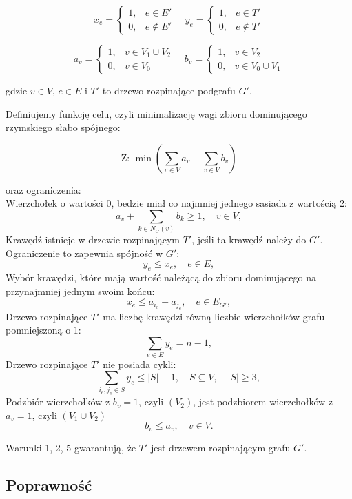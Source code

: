 \[
x_e =
\begin{cases}
1, & e \in E' \\
0, & e \notin E'
\end{cases}
\quad
y_e =
\begin{cases}
1, & e \in T' \\
0, & e \notin T'
\end{cases}
\]

\[
a_v =
\begin{cases}
1, & v \in V_1 \cup V_2 \\
0, & v \in V_0
\end{cases}
\quad
b_v =
\begin{cases}
1, & v \in V_2 \\
0, & v \in V_0 \cup V_1
\end{cases}
\]

gdzie \( v \in V \), \( e \in E \) i \( T' \) to drzewo rozpinające podgrafu \( G' \).

Definiujemy funkcję celu, czyli minimalizację wagi zbioru dominującego rzymskiego słabo spójnego:

\[
\text{Z: } \min \left( \sum_{v \in V} a_v + \sum_{v \in V} b_v \right)
\]

oraz ograniczenia:\\
Wierzchołek o wartości 0, bedzie miał co najmniej jednego sasiada z wartością 2:
\[
    a_v + \sum_{k \in N_G(v)} b_k \geq 1, \quad v \in V, \tag{1}
\]
Krawędź istnieje w drzewie rozpinającym \( T' \), jeśli ta krawędź należy do \( G' \). Ograniczenie to zapewnia spójność w \( G' \):
\[
    y_e \leq x_e, \quad e \in E, \tag{2}
\]
Wybór krawędzi, które mają  wartość należącą do zbioru dominującego na przynajmniej jednym swoim końcu:
\[
    x_e \leq a_{i_e} + a_{j_e}, \quad e \in E_{G'}, \tag{3}
\]
Drzewo rozpinające \( T' \) ma liczbę krawędzi równą liczbie wierzchołków grafu pomniejszoną o 1:
\[
    \sum_{e \in E} y_e = n - 1, \tag{4}
\]
Drzewo rozpinające \( T' \) nie posiada cykli:
\[
    \sum_{i_e, j_e \in S} y_e \leq |S| - 1, \quad S \subseteq V, \quad |S| \geq 3, \tag{5}
\]
Podzbiór wierzchołków z $b_v = 1$, czyli $(V_2)$, jest podzbiorem wierzchołków z $a_v = 1$, czyli $(V_1 \cup V_2)$
\[
    b_v \leq a_v, \quad v \in V. \tag{6}
\]

Warunki 1, 2, 5 gwarantują, że \( T' \) jest drzewem rozpinającym grafu \( G' \).

\subsection{Poprawność}

